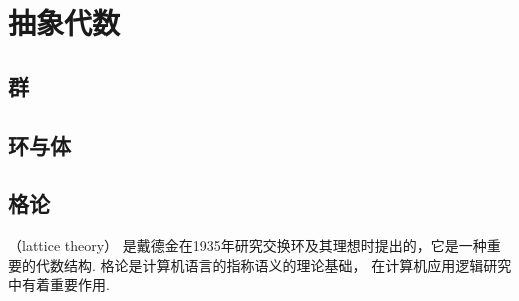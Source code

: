 \part{抽象代数}

\chapter{群}






\chapter{环与体}





\chapter{格论}
（lattice theory）
是戴德金在1935年研究交换环及其理想时提出的，它是一种重要的代数结构.
格论是计算机语言的指称语义的理论基础，
在计算机应用逻辑研究中有着重要作用.




